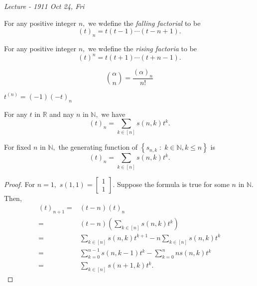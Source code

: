 

\noindent
\emph{Lecture - 19\hfill 11 Oct 24, Fri}

\begin{definition}
	For any positive integer $n,$ we wdefine the \emph{falling factorial} to be 
	$$ (t)_n = t(t-1) \cdots (t - n+1).$$
\end{definition}


\begin{definition}
	For any positive integer $n,$ we wdefine the \emph{rising factoria} to be 
	$$ (t)^n = t(t+1) \cdots (t + n-1).$$
\end{definition}


\begin{remark}
	$$\binom{ \alpha } {n} = \frac{( \alpha)_n}{n!} $$
\end{remark}

\begin{remark}
	$ t^{(n)} = (-1) (-t)_n $
\end{remark}


\begin{theorem}
	For any $t$ in $\mathbb{R}$ and nay $n $ in $\mathbb{N},$ we have
	$$(t)_n = \sum_{k \in [n]} s(n,k) t^k. $$
\end{theorem}

\begin{remark}
	For fixed $n$ in $\mathbb{N},$ the generating function of 
	$\left\{ s_{n,k} \;:\; k \in \mathbb{N} , k \leq n \right\} $ is
	$$ (t)_n = \sum_{k \in [n]} s(n,k)t^k. $$
\end{remark}
\begin{proof}
	For $n=1,$ $s(1,1) = 
	\begin{bmatrix} 1\\1 \end{bmatrix}.$
Suppose the formula is true for some $n$ in $\mathbb{N}.$ Then,
\begin{align*}
	(t)_{n+1}
	={}& (t-n) (t)_n \\
	={}& (t-n) \left( \sum_{k \in [n]} s(n,k) t^k \right)  \\
	={}& \sum_{k \in [n]} s(n,k) t^{k+1} - n \sum_{k \in [n]} s(n,k) t^k  \\
	={}& \sum_{k=0}^{n-1} s(n,k-1) t^k - \sum_{k=0}^{n} n s(n,k) t^k\\
	={}& \sum_{k \in [n]} s(n+1,k) t^k.
\end{align*}
\end{proof}



